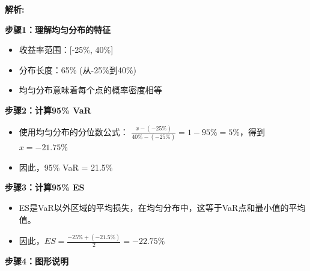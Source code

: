 \documentclass{article}
\newenvironment{explanation}
{\textbf{解析:}\par}
{\par}
\begin{document}
            \begin{explanation}
            \textbf{步骤1：理解均匀分布的特征}
            \begin{itemize}
                \item 收益率范围：[-25\%, 40\%]
                \item 分布长度：65\% (从-25\%到40\%)
                \item 均匀分布意味着每个点的概率密度相等
            \end{itemize}
            
            \textbf{步骤2：计算95\% VaR}
            \begin{itemize}
                \item 使用均匀分布的分位数公式： $\frac{x-(-25\%)}{40\%-(-25\%)} = 1-95\% = 5\%$，得到$x = -21.75\%$
                \item 因此，95\% VaR = 21.5\%
            \end{itemize}
            
            \textbf{步骤3：计算95\% ES}
            \begin{itemize}
                \item ES是VaR以外区域的平均损失，在均匀分布中，这等于VaR点和最小值的平均值。
                \item 因此，$ES = \frac{-25\% + (-21.5\%)}{2} = -22.75\%$
            \end{itemize}
            
            \textbf{步骤4：图形说明}
            \begin{center}
\end{center}
\end{explanation}
\end{document}
